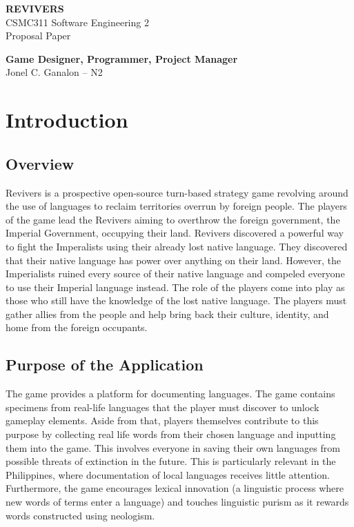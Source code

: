 \documentclass[11pt]{article}
\begin{document}
\begin{titlepage}
  \thispagestyle{fancy}

  \vspace*{4cm}
  \centering
    \vfill
    {\LARGE \textbf{REVIVERS}} \\
    \vspace{0.5cm}
    CSMC311 Software Engineering 2 \\
    Proposal Paper
    
    \vfill

    \textbf{Game Designer, Programmer, Project Manager} \\
    Jonel C. Ganalon -- N2

    \vspace{1cm}
    
    \vfill 
\end{titlepage}

\section{Introduction}
\subsection{Overview}
Revivers is a prospective open-source turn-based strategy game revolving around the use of languages to reclaim territories overrun by foreign people. The players of the game lead the Revivers aiming to overthrow the foreign government, the Imperial Government, occupying their land. Revivers discovered a powerful way to fight the Imperalists using their already lost native language. They discovered that their native language has power over anything on their land. However, the Imperialists ruined every source of their native language and compeled everyone to use their Imperial language instead. The role of the players come into play as those who still have the knowledge of the lost native language. The players must gather allies from the people and help bring back their culture, identity, and home from the foreign occupants.


\subsection{Purpose of the Application}
The game provides a platform for documenting languages. The game contains specimens from real-life languages that the player must discover to unlock gameplay elements. Aside from that, players themselves contribute to this purpose by collecting real life words from their chosen language and inputting them into the game. This involves everyone in saving their own languages from possible threats of extinction in the future. This is particularly relevant in the Philippines, where documentation of local languages receives little attention. Furthermore, the game encourages lexical innovation (a linguistic process where new words of terms enter a language) and touches linguistic purism as it rewards words constructed using neologism.
\end{document}
